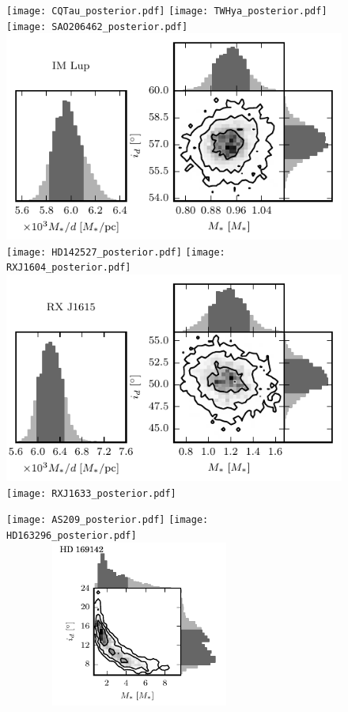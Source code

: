 \documentclass[twocolumn]{aastex6}
\begin{document}
\begin{figure}[htb]
\begin{center}
\texttt{[image: CQTau\_posterior.pdf]}
\texttt{[image: TWHya\_posterior.pdf]}
\texttt{[image: SAO206462\_posterior.pdf]}
\includegraphics{IMLup_posterior.pdf}
\texttt{[image: HD142527\_posterior.pdf]}
\texttt{[image: RXJ1604\_posterior.pdf]}
\includegraphics{RXJ1615_posterior.pdf}
\texttt{[image: RXJ1633\_posterior.pdf]}
\end{center}
\end{figure}

\begin{figure}[htb]
\begin{center}
\texttt{[image: AS209\_posterior.pdf]}
\texttt{[image: HD163296\_posterior.pdf]}
\includegraphics[draft, width=3.5in, height=2.15in]{HD169142_posterior.pdf}
\end{center}
\end{figure}
\end{document}
